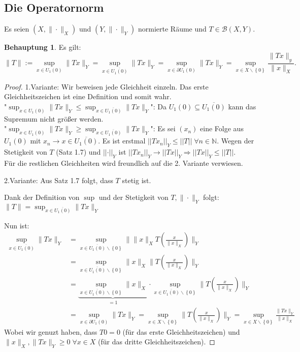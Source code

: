 \documentclass[ngerman]{article}
\theoremstyle{definition}%
\newtheorem*{beh}{Behauptung}
\newcommand{\N}{\mathbb{N}}
\newcommand{\B}{\mathcal{B}} %
\newcommand{\norm}[1]{\left\lvert \left\lvert #1 \right\rvert \right\rvert}
\newcommand{\df}{\Rightarrow} %
\newcommand{\afs}{"{}}
\renewcommand{\{ }{\left\lbrace}
\renewcommand{\}}{\right\rbrace}
\begin{document}
\subsection{Die Operatornorm}
Es seien $(X,\|\cdot\|_X)$ und $(Y,\|\cdot\|_Y)$ normierte Räume und $T\in \B(X,Y)$.
\begin{beh}
	Es gilt:
	$$\|T\|:=\sup_{x\in U_1(0)} \|Tx\|_Y = \sup_{x\in\overline{U_1(0)}}\|Tx\|_Y = \sup_{x\in \partial U_1(0)} \|Tx\|_Y = \sup_{x\in X\backslash \{0\}} \frac{\|Tx\|_y}{\|x\|_X}.$$
\end{beh}
\begin{proof}
1.Variante: 
	Wir beweisen jede Gleichheit einzeln. Das erste Gleichheitszeichen ist eine Definition und somit wahr.\\
	\afs$\sup_{x\in U_1(0)} \|Tx\|_Y \leq \sup_{x\in\overline{U_1(0)}}\|Tx\|_Y$\afs :
	Da $U_1(0) \subseteq  \overline{U_1(0)}$ kann das Supremum nicht größer werden.\\
	\afs$\sup_{x\in U_1(0)} \|Tx\|_Y \geq \sup_{x\in\overline{U_1(0)}}\|Tx\|_Y$\afs:
	Es sei $(x_n)$ eine Folge aus $U_1(0)$ mit $x_n \to x \in \overline{U_1(0)}$. Es ist erstmal $\norm{ Tx_n}_Y \leq \norm { T }\; \forall n\in\N$. Wegen der Stetigkeit von $T$ (Satz 1.7) und $\norm{ \cdot }_Y$ ist $\norm{Tx_n}_Y \to \norm{Tx}_Y \df \norm{Tx}_Y \leq \norm{T}$.\\
	Für die restlichen Gleichheiten wird freundlich auf die 2. Variante verwiesen.\par\bigskip
		
2.Variante:
	Aus Satz 1.7 folgt, dass $T$ stetig ist. \par 
	Dank der Definition von $\sup$ und der Stetigkeit von $T,\|\cdot \|_Y$ folgt: $\displaystyle \|T\|=\sup_{x\in\overline{U_1(0)}}\|Tx\|_Y$ \par 
	Nun ist: 
	\begin{equation*}
\begin{split}
\sup_{x\in\overline{U_1(0)}}\|Tx\|_Y & = \sup_{x\in\overline{U_1(0)}\backslash\{0\}}\|\|x\|_X T\left(\frac{x}{\|x\|_X}\right)\|_Y
\\ & = \sup_{x\in\overline{U_1(0)}\backslash\{0\}}\|x\|_X \|T\left(\frac{x}{\|x\|_X}\right)\|_Y
\\ & = \underbrace{\sup_{x\in\overline{U_1(0)}\backslash\{0\}}\|x\|_X}_{=1}
	   \cdot \sup_{x\in\overline{U_1(0)}\backslash\{0\}} \|T\left(\frac{x}{\|x\|_X}\right)\|_Y
\\ & = \sup_{x\in \partial U_1(0)} \|Tx\|_Y  =
	\sup_{x\in X\backslash\{0\}} \|T\left(\frac{x}{\|x\|_X}\right)\|_Y
 = \sup_{x\in X\backslash\{0\}} \frac{\|Tx\|_Y}{\|x\|_X}
\end{split}
\end{equation*}
Wobei wir genuzt haben, dass $T0 = 0$ (für das erste Gleichheitszeichen) und $\|x\|_X,\|Tx\|_Y\geq 0\;\forall x\in X$ (für das dritte Gleichheitszeichen). 
\end{proof}
\end{document}
